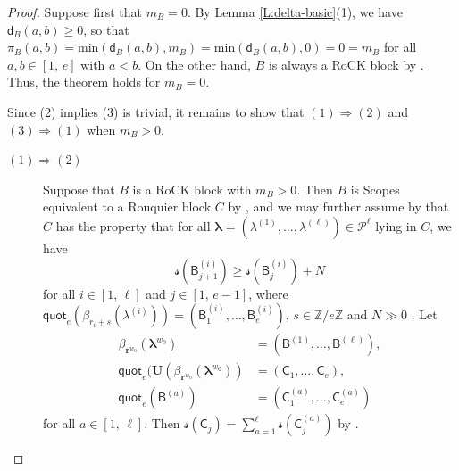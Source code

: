 \documentclass[11pt,a4paper,reqno]{amsart}
\numberwithin{equation}{section}
\theoremstyle{plain}
\theoremstyle{definition}
\theoremstyle{remark}
\numberwithin{equation}{section}
\newcommand{\bl}{\boldsymbol{\lambda}}
\newcommand{\UU}{\mathbf{U}}
\newcommand{\fs}{\mathcal{s}}
\newcommand{\br}{\mathbf{r}}
\newcommand{\quot}{\mathsf{quot}}
\renewcommand{\min}{\mathrm{min}}
\newcommand{\ZZ}{\mathbb{Z}}
\newcommand{\B}{\mathsf{B}}
\newcommand{\C}{\mathsf{C}}
\newcommand{\PP}{\mathcal{P}}
\newcommand{\dd}{\mathsf{d}}
\begin{document}
\begin{proof} 
Suppose first that $m_B = 0$.
By Lemma \ref{L:delta-basic}(1), we have $\dd_B(a,b) \geq 0$, so that $\pi_B(a,b) = \min(\dd_B(a,b), m_B) = \min(\dd_B(a,b), 0) = 0 = m_B$ for all $a,b \in [1,\,e]$ with $a< b$.  
On the other hand, $B$ is always a RoCK block by \cite[Theorem 3.17 and Corollary 4.27]{LQT}.
Thus, the theorem holds for $m_B =0$.

Since (2) implies (3) is trivial, it remains to show that $(1) \Rightarrow (2)$ and $(3) \Rightarrow (1)$ when $m_B > 0$.

\begin{description}
\item[$(1) \Rightarrow (2)$]

Suppose that $B$ is a RoCK block with $m_B > 0$.
Then $B$ is Scopes equivalent to a Rouquier block $C$ by \cite[Proposition~4.6]{Webster}, and we may further assume 
by \cite[Proposition 3.18]{Lyle-RoCK} that $C$ has the property that for all $\bl = (\lambda^{(1)}, \dotsc, \lambda^{(\ell)}) \in \PP^{\ell}$ lying in $C$, we have $$\fs(\B^{(i)}_{j+1}) \geq \fs(\B^{(i)}_j) +N$$ for all $i \in [1,\, \ell]$ and $j \in [1,\, e-1]$, where $\quot_e(\beta_{r_i+s}(\lambda^{(i)})) = (\B^{(i)}_1,\dotsc,\B^{(i)}_e)$, $s \in \ZZ/e\ZZ$ and $N \gg 0$ .
Let
\begin{align*}
\beta_{\br^{w_0}}(\bl^{w_0})  &= (\B^{(1)},\dotsc, \B^{(\ell)}), \\
\quot_e(\UU(\beta_{\br^{w_0}}(\bl^{w_0})) &= (\C_1,\dotsc, \C_e), \\
\quot_e(\B^{(a)}) &= (\C^{(a)}_1, \dotsc, \C^{(a)}_e)
\end{align*}
for all $a \in [1,\,\ell]$.
Then $\fs(\C_j) = \sum_{a=1}^{\ell} \fs(\C^{(a)}_j)$ by \cite[Lemma 2.6(2)]{LT}.


\end{description}
\end{proof}
\end{document}
